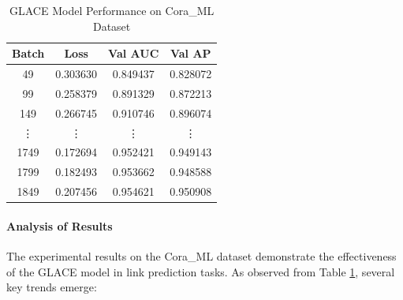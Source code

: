 \documentclass[11pt]{article}
\begin{document}
\begin{table}[h]
    \centering
    \caption{GLACE Model Performance on Cora\_ML Dataset}
    \label{tab:experimental_results}
    \begin{tabular}{cccc}
        \hline
        \textbf{Batch} & \textbf{Loss} & \textbf{Val AUC} & \textbf{Val AP} \\
        \hline
        49    & 0.303630 & 0.849437 & 0.828072 \\
        99    & 0.258379 & 0.891329 & 0.872213 \\
        149   & 0.266745 & 0.910746 & 0.896074 \\
        \vdots & \vdots   & \vdots    & \vdots    \\
        1749  & 0.172694 & 0.952421 & 0.949143 \\
        1799  & 0.182493 & 0.953662 & 0.948588 \\
        1849  & 0.207456 & 0.954621 & 0.950908 \\
        \hline
    \end{tabular}
\end{table}

\paragraph{Analysis of Results}
The experimental results on the Cora\_ML dataset demonstrate the effectiveness of the GLACE model in link prediction tasks. As observed from Table \ref{tab:experimental_results}, several key trends emerge:
\end{document}
